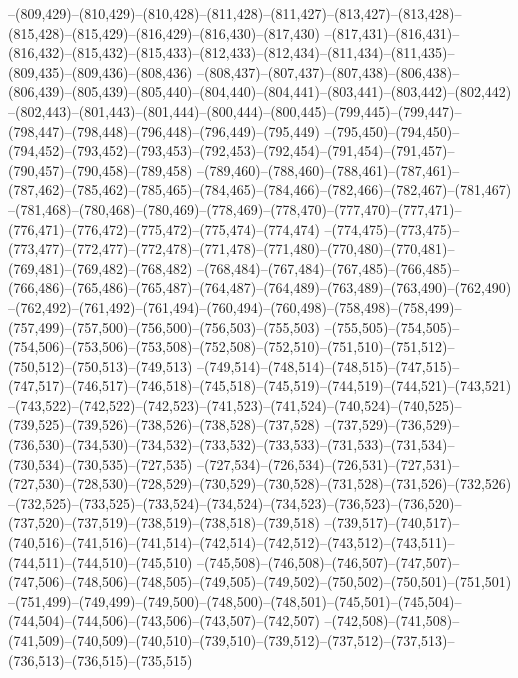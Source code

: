 --(809,429)--(810,429)--(810,428)--(811,428)--(811,427)--(813,427)--(813,428)--(815,428)--(815,429)--(816,429)--(816,430)--(817,430)
--(817,431)--(816,431)--(816,432)--(815,432)--(815,433)--(812,433)--(812,434)--(811,434)--(811,435)--(809,435)--(809,436)--(808,436)
--(808,437)--(807,437)--(807,438)--(806,438)--(806,439)--(805,439)--(805,440)--(804,440)--(804,441)--(803,441)--(803,442)--(802,442)
--(802,443)--(801,443)--(801,444)--(800,444)--(800,445)--(799,445)--(799,447)--(798,447)--(798,448)--(796,448)--(796,449)--(795,449)
--(795,450)--(794,450)--(794,452)--(793,452)--(793,453)--(792,453)--(792,454)--(791,454)--(791,457)--(790,457)--(790,458)--(789,458)
--(789,460)--(788,460)--(788,461)--(787,461)--(787,462)--(785,462)--(785,465)--(784,465)--(784,466)--(782,466)--(782,467)--(781,467)
--(781,468)--(780,468)--(780,469)--(778,469)--(778,470)--(777,470)--(777,471)--(776,471)--(776,472)--(775,472)--(775,474)--(774,474)
--(774,475)--(773,475)--(773,477)--(772,477)--(772,478)--(771,478)--(771,480)--(770,480)--(770,481)--(769,481)--(769,482)--(768,482)
--(768,484)--(767,484)--(767,485)--(766,485)--(766,486)--(765,486)--(765,487)--(764,487)--(764,489)--(763,489)--(763,490)--(762,490)
--(762,492)--(761,492)--(761,494)--(760,494)--(760,498)--(758,498)--(758,499)--(757,499)--(757,500)--(756,500)--(756,503)--(755,503)
--(755,505)--(754,505)--(754,506)--(753,506)--(753,508)--(752,508)--(752,510)--(751,510)--(751,512)--(750,512)--(750,513)--(749,513)
--(749,514)--(748,514)--(748,515)--(747,515)--(747,517)--(746,517)--(746,518)--(745,518)--(745,519)--(744,519)--(744,521)--(743,521)
--(743,522)--(742,522)--(742,523)--(741,523)--(741,524)--(740,524)--(740,525)--(739,525)--(739,526)--(738,526)--(738,528)--(737,528)
--(737,529)--(736,529)--(736,530)--(734,530)--(734,532)--(733,532)--(733,533)--(731,533)--(731,534)--(730,534)--(730,535)--(727,535)
--(727,534)--(726,534)--(726,531)--(727,531)--(727,530)--(728,530)--(728,529)--(730,529)--(730,528)--(731,528)--(731,526)--(732,526)
--(732,525)--(733,525)--(733,524)--(734,524)--(734,523)--(736,523)--(736,520)--(737,520)--(737,519)--(738,519)--(738,518)--(739,518)
--(739,517)--(740,517)--(740,516)--(741,516)--(741,514)--(742,514)--(742,512)--(743,512)--(743,511)--(744,511)--(744,510)--(745,510)
--(745,508)--(746,508)--(746,507)--(747,507)--(747,506)--(748,506)--(748,505)--(749,505)--(749,502)--(750,502)--(750,501)--(751,501)
--(751,499)--(749,499)--(749,500)--(748,500)--(748,501)--(745,501)--(745,504)--(744,504)--(744,506)--(743,506)--(743,507)--(742,507)
--(742,508)--(741,508)--(741,509)--(740,509)--(740,510)--(739,510)--(739,512)--(737,512)--(737,513)--(736,513)--(736,515)--(735,515)
